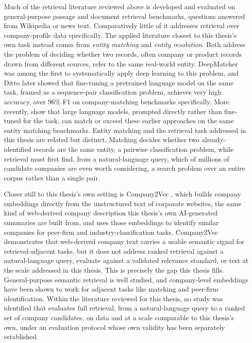 \documentclass[a4paper,oneside,bibliography=totoc]{scrbook}
\begin{document}
Much of the retrieval literature reviewed above is developed and evaluated on general-purpose passage and document retrieval benchmarks, questions answered from Wikipedia or news text. Comparatively little of it addresses retrieval over company-profile data specifically. The applied literature closest to this thesis's own task instead comes from \emph{entity matching} and \emph{entity resolution}. Both address the problem of deciding whether two records, often company or product records drawn from different sources, refer to the same real-world entity. DeepMatcher \citep{mudgal2018deep} was among the first to systematically apply deep learning to this problem, and Ditto \citep{li2020deep} later showed that fine-tuning a pretrained language model on the same task, framed as a sequence-pair classification problem, achieves very high accuracy, over 96\% F1 on company-matching benchmarks specifically. More recently, \citet{peeters2025entity} show that large language models, prompted directly rather than fine-tuned for the task, can match or exceed these earlier approaches on the same entity matching benchmarks. Entity matching and the retrieval task addressed in this thesis are related but distinct. Matching decides whether two already-identified records are the same entity, a pairwise classification problem, while retrieval must first find, from a natural-language query, which of millions of candidate companies are even worth considering, a search problem over an entire corpus rather than a single pair.

Closer still to this thesis's own setting is Company2Vec \citep{gerling2023company}, which builds company embeddings directly from the unstructured text of corporate websites, the same kind of web-derived company description this thesis's own AI-generated summaries are built from, and uses those embeddings to identify similar companies for peer-firm and industry-classification tasks. Company2Vec demonstrates that web-derived company text carries a usable semantic signal for retrieval-adjacent tasks, but it does not address ranked retrieval against a natural-language query, evaluate against a validated relevance standard, or test at the scale addressed in this thesis. This is precisely the gap this thesis fills. General-purpose semantic retrieval is well studied, and company-level embeddings have been shown to work for adjacent tasks like matching and peer-firm identification. Within the literature reviewed for this thesis, no study was identified that evaluates full retrieval, from a natural-language query to a ranked set of company candidates, on data and at a scale comparable to this thesis's own, under an evaluation protocol whose own validity has been separately established.
\end{document}
